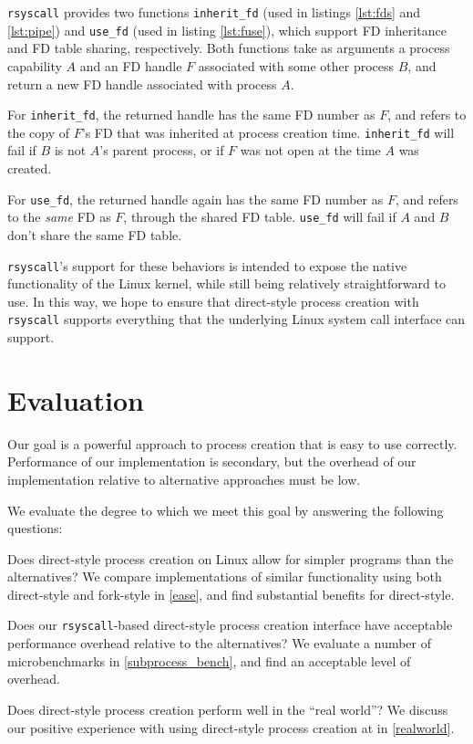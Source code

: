 \documentclass[letterpaper,twocolumn,10pt]{article}
\begin{document}
\texttt{rsyscall} provides two functions
\texttt{inherit\_fd} (used in listings \ref{lst:fds} and \ref{lst:pipe})
and \texttt{use\_fd} (used in listing \ref{lst:fuse}), which support FD inheritance and FD table sharing, respectively.
Both functions take as arguments a process capability $A$ and an FD handle $F$ associated with some other process $B$,
and return a new FD handle associated with process $A$.

For \texttt{inherit\_fd},
the returned handle has the same FD number as $F$,
and refers to the copy of $F$'s FD that was inherited at process creation time.
\texttt{inherit\_fd} will fail if $B$ is not $A$'s parent process,
or if $F$ was not open at the time $A$ was created.

For \texttt{use\_fd},
the returned handle again has the same FD number as $F$,
and refers to the \textit{same} FD as $F$, through the shared FD table.
\texttt{use\_fd} will fail if $A$ and $B$ don't share the same FD table.

\texttt{rsyscall}'s support for these behaviors is intended to expose the native functionality of the Linux kernel,
while still being relatively straightforward to use.
In this way,
we hope to ensure that direct-style process creation with \texttt{rsyscall}
supports everything that the underlying Linux system call interface can support.
\section{Evaluation}\label{evaluation}
Our goal is a powerful approach to process creation that is easy to use correctly.
Performance of our implementation is secondary,
but the overhead of our implementation relative to alternative approaches
must be low.

We evaluate the degree to which we meet this goal by answering the following questions:
\begin{compactitem}
\item
  Does direct-style process creation on Linux allow for simpler programs than the alternatives?
  We compare implementations of similar functionality using both direct-style and fork-style in \ref{ease},
  and find substantial benefits for direct-style.
\item
  Does our \texttt{rsyscall}-based direct-style process creation interface
  have acceptable performance overhead relative to the alternatives?
  We evaluate a number of microbenchmarks in \ref{subprocess_bench},
  and find an acceptable level of overhead.
\item
  Does direct-style process creation perform well in the ``real world''?
  We discuss our positive experience with using direct-style process creation at \twosigma{} in \ref{realworld}.
\end{compactitem}
\end{document}
